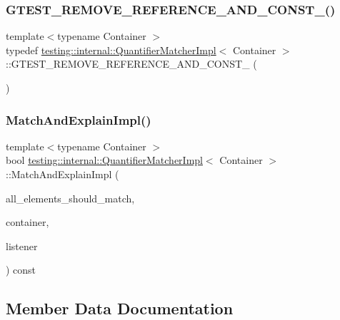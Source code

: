 \subsubsection{\texorpdfstring{G\+T\+E\+S\+T\+\_\+\+R\+E\+M\+O\+V\+E\+\_\+\+R\+E\+F\+E\+R\+E\+N\+C\+E\+\_\+\+A\+N\+D\+\_\+\+C\+O\+N\+S\+T\+\_\+()}{GTEST\_REMOVE\_REFERENCE\_AND\_CONST\_()}}
{\footnotesize\ttfamily template$<$typename Container $>$ \\
typedef \hyperlink{classtesting_1_1internal_1_1_quantifier_matcher_impl}{testing\+::internal\+::\+Quantifier\+Matcher\+Impl}$<$ Container $>$\+::G\+T\+E\+S\+T\+\_\+\+R\+E\+M\+O\+V\+E\+\_\+\+R\+E\+F\+E\+R\+E\+N\+C\+E\+\_\+\+A\+N\+D\+\_\+\+C\+O\+N\+S\+T\+\_\+ (\begin{DoxyParamCaption}\item[{Container}]{ }\end{DoxyParamCaption})}

\mbox{\label{classtesting_1_1internal_1_1_quantifier_matcher_impl_ab8f64532b70f47fc60f7983ebe5cbfc6}} 
\subsubsection{\texorpdfstring{Match\+And\+Explain\+Impl()}{MatchAndExplainImpl()}}
{\footnotesize\ttfamily template$<$typename Container $>$ \\
bool \hyperlink{classtesting_1_1internal_1_1_quantifier_matcher_impl}{testing\+::internal\+::\+Quantifier\+Matcher\+Impl}$<$ Container $>$\+::Match\+And\+Explain\+Impl (\begin{DoxyParamCaption}\item[{bool}]{all\+\_\+elements\+\_\+should\+\_\+match,  }\item[{Container}]{container,  }\item[{\hyperlink{classtesting_1_1_match_result_listener}{Match\+Result\+Listener} $\ast$}]{listener }\end{DoxyParamCaption}) const\hspace{0.3cm}{\ttfamily [inline]}}



\subsection{Member Data Documentation}
\mbox{\label{classtesting_1_1internal_1_1_quantifier_matcher_impl_af0ee2a4697f5cb8e937fd29dd75e2a30}} 
